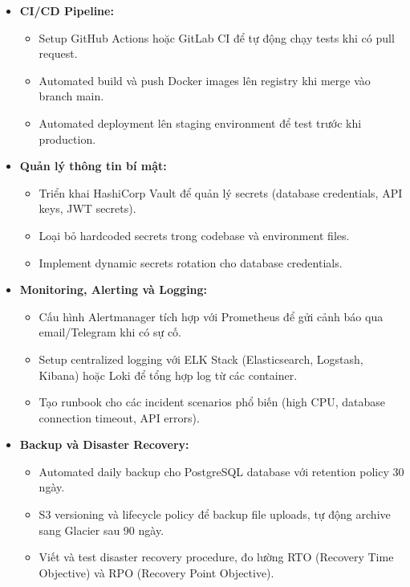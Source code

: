 \begin{itemize}
    \item \textbf{CI/CD Pipeline:}
    \begin{itemize}
        \item Setup GitHub Actions hoặc GitLab CI để tự động chạy tests khi có pull request.
        \item Automated build và push Docker images lên registry khi merge vào branch main.
        \item Automated deployment lên staging environment để test trước khi production.
    \end{itemize}
    
    \item \textbf{Quản lý thông tin bí mật:}
    \begin{itemize}
        \item Triển khai HashiCorp Vault để quản lý secrets (database credentials, API keys, JWT secrets).
        \item Loại bỏ hardcoded secrets trong codebase và environment files.
        \item Implement dynamic secrets rotation cho database credentials.
    \end{itemize}
    
    \item \textbf{Monitoring, Alerting và Logging:}
    \begin{itemize}
        \item Cấu hình Alertmanager tích hợp với Prometheus để gửi cảnh báo qua email/Telegram khi có sự cố.
        \item Setup centralized logging với ELK Stack (Elasticsearch, Logstash, Kibana) hoặc Loki để tổng hợp log từ các container.
        \item Tạo runbook cho các incident scenarios phổ biến (high CPU, database connection timeout, API errors).
    \end{itemize}
    
    \item \textbf{Backup và Disaster Recovery:}
    \begin{itemize}
        \item Automated daily backup cho PostgreSQL database với retention policy 30 ngày.
        \item S3 versioning và lifecycle policy để backup file uploads, tự động archive sang Glacier sau 90 ngày.
        \item Viết và test disaster recovery procedure, đo lường RTO (Recovery Time Objective) và RPO (Recovery Point Objective).
    \end{itemize}
    

\end{itemize}
